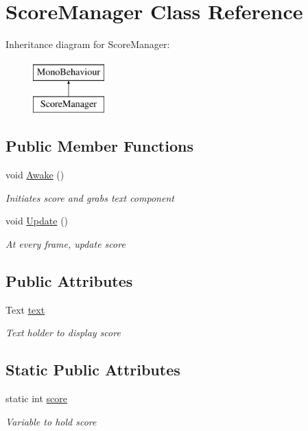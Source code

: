 \hypertarget{classScoreManager}{\section{Score\-Manager Class Reference}
\label{classScoreManager}
}
Inheritance diagram for Score\-Manager\-:\begin{figure}[H]
\begin{center}
\leavevmode
\includegraphics[height=2.000000cm]{classScoreManager}
\end{center}
\end{figure}
\subsection*{Public Member Functions}
\begin{DoxyCompactItemize}
\item 
void \hyperlink{classScoreManager_a68b661eece0b6102ad825d88990a83f8}{Awake} ()
\begin{DoxyCompactList}\small\item\em Initiates score and grabs text component \end{DoxyCompactList}\item 
void \hyperlink{classScoreManager_a0d37ca647468e53d1735d8d185b7ee34}{Update} ()
\begin{DoxyCompactList}\small\item\em At every frame, update score \end{DoxyCompactList}\end{DoxyCompactItemize}
\subsection*{Public Attributes}
\begin{DoxyCompactItemize}
\item 
Text \hyperlink{classScoreManager_a7ef05edbcfef0503c0e0cc501e71e95e}{text}
\begin{DoxyCompactList}\small\item\em Text holder to display score \end{DoxyCompactList}\end{DoxyCompactItemize}
\subsection*{Static Public Attributes}
\begin{DoxyCompactItemize}
\item 
static int \hyperlink{classScoreManager_ab0036417bd3468315aec1def60f46221}{score}
\begin{DoxyCompactList}\small\item\em Variable to hold score \end{DoxyCompactList}\end{DoxyCompactItemize}


